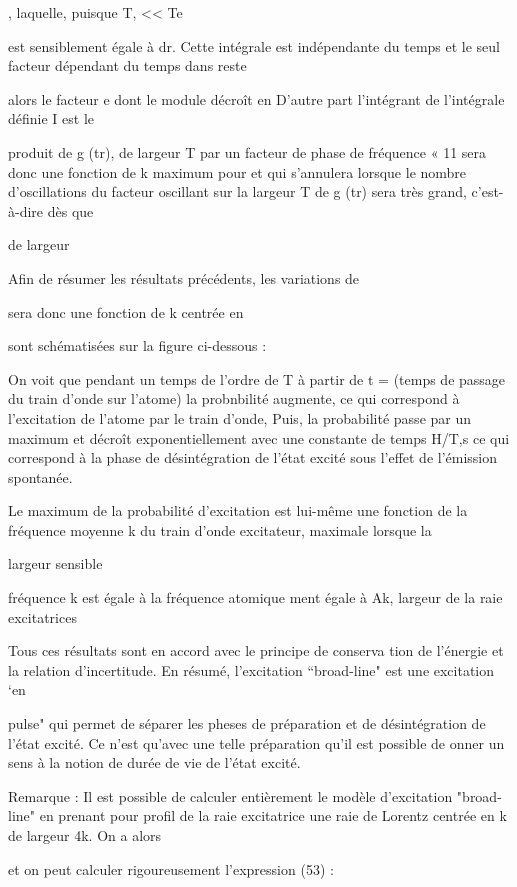 , laquelle, puisque T, << Te

est sensiblement égale à
dr. Cette intégrale est indépendante
du temps et le seul facteur dépendant du temps dans reste

alors le facteur e dont le module décroît en
D'autre part l'intégrant de l'intégrale définie I est le

produit de g (tr), de largeur T par un facteur de phase de fréquence
 « 11 sera donc une fonction de k maximum pour 
et qui s'annulera lorsque le nombre d'oscillations du facteur oscillant sur la
largeur T de g (tr) sera très grand, c'est-à-dire dès que

 de largeur

Afin de résumer les résultats précédents, les variations de

sera donc une fonction de k centrée en

sont schématisées sur la figure ci-dessous :

On voit que pendant un temps de l'ordre de T à partir de t =
(temps de passage du train d'onde sur l'atome) la probnbilité augmente, ce
qui correspond à l'excitation de l'atome par le train d'onde, Puis, la probabilité passe par un maximum et décroît exponentiellement avec une constante de
temps H/T,s ce qui correspond à la phase de désintégration de l'état excité
sous l'effet de l'émission spontanée.

Le maximum de la probabilité d'excitation est lui-même une fonction de la fréquence moyenne k du train d'onde excitateur, maximale lorsque la

largeur sensible

fréquence k est égale à la fréquence atomique
ment égale à Ak, largeur de la raie excitatrices

Tous ces résultats sont en accord avec le principe de conserva
tion de l'énergie et la relation d'incertitude.
En résumé, l'excitation “broad-line" est une excitation ‘en

pulse" qui permet de séparer les pheses de préparation et de désintégration de
l'état excité. Ce n'est qu'avec une telle préparation qu'il est possible de onner un sens à la notion de durée de vie de l'état excité.

Remarque : Il est possible de calculer entièrement le modèle d'excitation "broad-line"
en prenant pour profil de la raie excitatrice une raie de Lorentz centrée en k
de largeur 4k. On a alors

et on peut calculer rigoureusement l'expression (53) :

